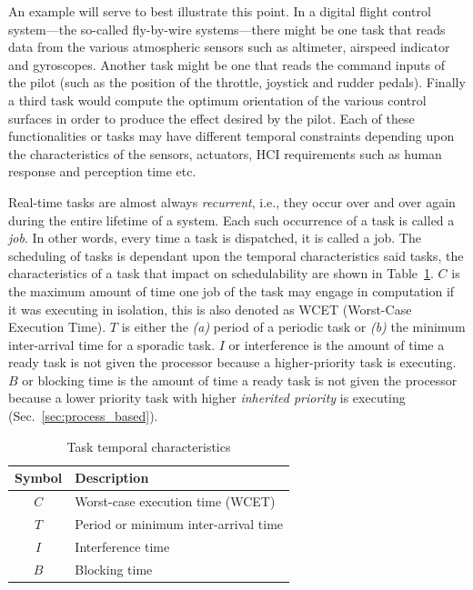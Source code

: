 An example will serve to best illustrate this point. In a digital
flight control system---the so-called fly-by-wire systems---there
might be one task that reads data from the various atmospheric sensors
such as altimeter, airspeed indicator and gyroscopes. Another task
might be one that reads the command inputs of the pilot (such as the
position of the throttle, joystick and rudder pedals). Finally a third
task would compute the optimum orientation of the various control
surfaces in order to produce the effect desired by the pilot. Each of
these functionalities or tasks may have different temporal constraints
depending upon the characteristics of the sensors, actuators, HCI
requirements such as human response and perception time etc.

Real-time tasks are almost always \emph{recurrent}, i.e., they occur
over and over again during the entire lifetime of a system. Each such
occurrence of a task is called a \emph{job}. In other words, every
time a task is dispatched, it is called a job. The scheduling of tasks
is dependant upon the temporal characteristics said tasks, the
characteristics of a task that impact on schedulability are shown in
Table~\ref{tab:task_chars}. $C$ is the maximum amount of time one job
of the task may engage in computation if it was executing in
isolation, this is also denoted as WCET (Worst-Case Execution
Time). $T$ is either the \emph{(a)} period of a periodic task or
\emph{(b)} the minimum inter-arrival time for a sporadic task. $I$ or
interference is the amount of time a ready task is not given the
processor because a higher-priority task is executing. $B$ or blocking
time is the amount of time a ready task is not given the processor
because a lower priority task with higher \emph{inherited priority} is
executing (Sec.~\ref{sec:process_based}).

\begin{table}
\centering
\begin{tabular}{|c|l|}
\hline
\textbf{Symbol} & \textbf{Description}\\
\hline
$C$ & Worst-case execution time (WCET)\\
$T$ & Period or minimum inter-arrival time\\
$I$ & Interference time\\
$B$ & Blocking time\\
\hline
\end{tabular}
\caption{Task temporal characteristics}
\label{tab:task_chars}
\end{table}

